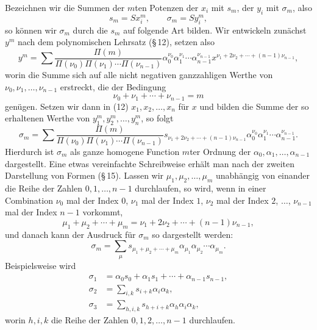 \documentclass[11pt]{article}
\begin{document}
Bezeichnen wir die Summen der $m$ten Potenzen der $x_i$ mit $s_m$, der $y_i$ mit $\sigma_m$, also
\[
s_m=Sx_i^m,
\qquad
\sigma_m=Sy_i^m,
\]
so können wir $\sigma_m$ durch die $s_m$ auf folgende Art bilden. Wir entwickeln zunächst $y^m$ nach dem polynomischen Lehrsatz (\S\,12), setzen also
\begin{equation}
y^m=\sum \frac{\Pi(m)}{\Pi(\nu_0)\Pi(\nu_1)\cdots\Pi(\nu_{n-1})}
\alpha_0^{\nu_0}\alpha_1^{\nu_1}\cdots\alpha_{n-1}^{\nu_{n-1}}
 x^{\nu_1+2\nu_2+\cdots+(n-1)\nu_{n-1}},
\tag{12}
\end{equation}
worin die Summe sich auf alle nicht negativen ganzzahligen Werthe von $\nu_0,\nu_1,\ldots,\nu_{n-1}$ erstreckt, die der Bedingung
\begin{equation}
\nu_0+\nu_1+\cdots+\nu_{n-1}=m
\tag{13}
\end{equation}
genügen. Setzen wir dann in (12) $x_1,x_2,
\ldots,x_n$ für $x$ und bilden die Summe der so erhaltenen Werthe von $y_1^m,y_2^m,\ldots,y_n^m$, so folgt
\begin{equation}
\sigma_m=\sum \frac{\Pi(m)}{\Pi(\nu_0)\Pi(\nu_1)\cdots\Pi(\nu_{n-1})}
 s_{\nu_1+2\nu_2+\cdots+(n-1)\nu_{n-1}}
 \alpha_0^{\nu_0}\alpha_1^{\nu_1}\cdots\alpha_{n-1}^{\nu_{n-1}}.
\tag{14}
\end{equation}
Hierdurch ist $\sigma_m$ als ganze homogene Function $m$ter Ordnung der $\alpha_0,\alpha_1,\ldots,\alpha_{n-1}$ dargestellt. Eine etwas vereinfachte Schreibweise erhält man nach der zweiten Darstellung von Formen (\S\,15). Lassen wir $\mu_1,\mu_2,\ldots,\mu_m$ unabhängig von einander die Reihe der Zahlen $0,1,\ldots,n-1$ durchlaufen, so wird, wenn in einer Combination $\nu_0$ mal der Index $0$, $\nu_1$ mal der Index $1$, $\nu_2$ mal der Index $2$, $\ldots$, $\nu_{n-1}$ mal der Index $n-1$ vorkommt,
\[
\mu_1+\mu_2+\cdots+\mu_m=\nu_1+2\nu_2+\cdots+(n-1)\nu_{n-1},
\]
und danach kann der Ausdruck für $\sigma_m$ so dargestellt werden:
\begin{equation}
\sigma_m=\sum_{\mu} s_{\mu_1+\mu_2+\cdots+\mu_m}\alpha_{\mu_1}\alpha_{\mu_2}\cdots\alpha_{\mu_m}.
\tag{15}
\end{equation}
Beispielsweise wird
\begin{equation}
\begin{aligned}
\sigma_1&=\alpha_0s_0+\alpha_1s_1+\cdots+\alpha_{n-1}s_{n-1},\\
\sigma_2&=\sum_{i,k}s_{i+k}\alpha_i\alpha_k,\\
\sigma_3&=\sum_{h,i,k}s_{h+i+k}\alpha_h\alpha_i\alpha_k,
\end{aligned}
\tag{16}
\end{equation}
worin $h,i,k$ die Reihe der Zahlen $0,1,2,\ldots,n-1$ durchlaufen.
\end{document}
